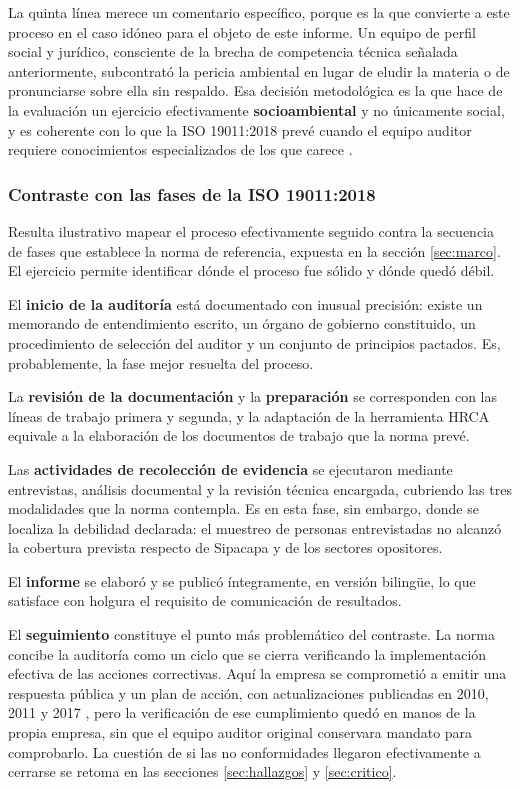 La quinta línea merece un comentario específico, porque es la que convierte a este
proceso en el caso idóneo para el objeto de este informe. Un equipo de perfil
social y jurídico, consciente de la brecha de competencia técnica señalada
anteriormente, subcontrató la pericia ambiental en lugar de eludir la materia o de
pronunciarse sobre ella sin respaldo. Esa decisión metodológica es la que hace de
la evaluación un ejercicio efectivamente \textbf{socioambiental} y no únicamente
social, y es coherente con lo que la ISO 19011:2018 prevé cuando el equipo
auditor requiere conocimientos especializados de los que carece
\parencite{iso2018iso19011}.

\subsubsection{Contraste con las fases de la ISO 19011:2018}

Resulta ilustrativo mapear el proceso efectivamente seguido contra la secuencia de
fases que establece la norma de referencia, expuesta en la sección
\ref{sec:marco}. El ejercicio permite identificar dónde el proceso fue sólido y
dónde quedó débil.

El \textbf{inicio de la auditoría} está documentado con inusual precisión: existe
un memorando de entendimiento escrito, un órgano de gobierno constituido, un
procedimiento de selección del auditor y un conjunto de principios pactados. Es,
probablemente, la fase mejor resuelta del proceso.

La \textbf{revisión de la documentación} y la \textbf{preparación} se corresponden
con las líneas de trabajo primera y segunda, y la adaptación de la herramienta
HRCA equivale a la elaboración de los documentos de trabajo que la norma prevé.

Las \textbf{actividades de recolección de evidencia} se ejecutaron mediante
entrevistas, análisis documental y la revisión técnica encargada, cubriendo las
tres modalidades que la norma contempla. Es en esta fase, sin embargo, donde se
localiza la debilidad declarada: el muestreo de personas entrevistadas no alcanzó
la cobertura prevista respecto de Sipacapa y de los sectores opositores.

El \textbf{informe} se elaboró y se publicó íntegramente, en versión bilingüe, lo
que satisface con holgura el requisito de comunicación de resultados.

El \textbf{seguimiento} constituye el punto más problemático del contraste. La
norma concibe la auditoría como un ciclo que se cierra verificando la
implementación efectiva de las acciones correctivas. Aquí la empresa se comprometió
a emitir una respuesta pública y un plan de acción, con actualizaciones
publicadas en 2010, 2011 y 2017 \parencite{oncommonground2010hria,
goldcorp2023marlin}, pero la verificación de ese cumplimiento quedó en manos de la
propia empresa, sin que el equipo auditor original conservara mandato para
comprobarlo. La cuestión de si las no conformidades llegaron efectivamente a
cerrarse se retoma en las secciones \ref{sec:hallazgos} y \ref{sec:critico}.

